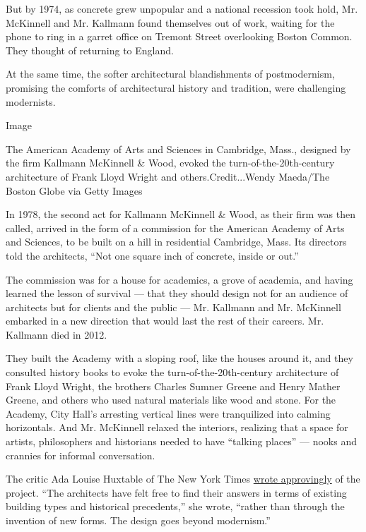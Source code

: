 But by 1974, as concrete grew unpopular and a national recession took
hold, Mr. McKinnell and Mr. Kallmann found themselves out of work,
waiting for the phone to ring in a garret office on Tremont Street
overlooking Boston Common. They thought of returning to England.

At the same time, the softer architectural blandishments of
postmodernism, promising the comforts of architectural history and
tradition, were challenging modernists.

Image

The American Academy of Arts and Sciences in Cambridge, Mass., designed
by the firm Kallmann McKinnell \& Wood, evoked the
turn-of-the-20th-century architecture of Frank Lloyd Wright and
others.Credit...Wendy Maeda/The Boston Globe via Getty Images

In 1978, the second act for Kallmann McKinnell \& Wood, as their firm
was then called, arrived in the form of a commission for the American
Academy of Arts and Sciences, to be built on a hill in residential
Cambridge, Mass. Its directors told the architects, ``Not one square
inch of concrete, inside or out.''

The commission was for a house for academics, a grove of academia, and
having learned the lesson of survival --- that they should design not
for an audience of architects but for clients and the public --- Mr.
Kallmann and Mr. McKinnell embarked in a new direction that would last
the rest of their careers. Mr. Kallmann died in 2012.

They built the Academy with a sloping roof, like the houses around it,
and they consulted history books to evoke the turn-of-the-20th-century
architecture of Frank Lloyd Wright, the brothers Charles Sumner Greene
and Henry Mather Greene, and others who used natural materials like wood
and stone. For the Academy, City Hall's arresting vertical lines were
tranquilized into calming horizontals. And Mr. McKinnell relaxed the
interiors, realizing that a space for artists, philosophers and
historians needed to have ``talking places'' --- nooks and crannies for
informal conversation.

The critic Ada Louise Huxtable of The New York Times
\href{https://www.nytimes.com/1981/09/20/arts/architecture-view-classical-clarity-in-an-academic-design-cambridge-mass.html}{wrote
approvingly} of the project. ``The architects have felt free to find
their answers in terms of existing building types and historical
precedents,'' she wrote, ``rather than through the invention of new
forms. The design goes beyond modernism.''

